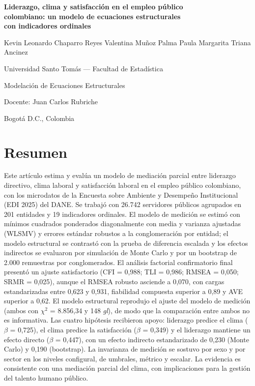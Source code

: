 \documentclass[11pt,a4paper]{article}
\newcommand{\chisq}{$\chi^2$}
\newcommand{\df}{\textit{gl}}
\begin{document}
\begin{center}
{\LARGE\bfseries Liderazgo, clima y satisfacción en el empleo público\\[2pt]
colombiano: un modelo de ecuaciones estructurales\\[2pt]
con indicadores ordinales\par}
\vspace{10pt}

{\large Kevin Leonardo Chaparro Reyes \quad Valentina Muñoz Palma \quad Paula Margarita Triana Ancinez\par}
\vspace{4pt}
{\normalsize Universidad Santo Tomás --- Facultad de Estadística\par}
{\normalsize Modelación de Ecuaciones Estructurales\par}
{\normalsize Docente: Juan Carlos Rubriche\par}
{\normalsize Bogotá D.C., Colombia\par}
\end{center}

\vspace{6pt}

\section*{Resumen}

Este artículo estima y evalúa un modelo de mediación parcial entre liderazgo directivo,
clima laboral y satisfacción laboral en el empleo público colombiano, con los microdatos
de la Encuesta sobre Ambiente y Desempeño Institucional (EDI 2025) del DANE. Se trabajó con
26.742 servidores públicos agrupados en 201 entidades y 19 indicadores ordinales. El modelo
de medición se estimó con mínimos cuadrados ponderados diagonalmente con media y varianza
ajustadas (WLSMV) y errores estándar robustos a la conglomeración por entidad; el modelo
estructural se contrastó con la prueba de diferencia escalada y los efectos indirectos se
evaluaron por simulación de Monte Carlo y por un bootstrap de 2.000 remuestras por
conglomerados. El análisis factorial confirmatorio final presentó un ajuste satisfactorio
(CFI = 0,988; TLI = 0,986; RMSEA = 0,050; SRMR = 0,025), aunque el RMSEA robusto asciende a
0,070, con cargas estandarizadas entre 0,623 y 0,931, fiabilidad compuesta superior a 0,89 y
AVE superior a 0,62. El modelo estructural reprodujo el ajuste del modelo de medición (ambos
con \chisq{} = 8.856,34 y 148 \df), de modo que la comparación entre ambos no es
informativa. Las cuatro hipótesis recibieron apoyo: liderazgo predice el clima
($\beta$ = 0,725), el clima predice la satisfacción ($\beta$ = 0,349) y el liderazgo
mantiene un efecto directo ($\beta$ = 0,447), con un efecto indirecto estandarizado de 0,230
(Monte Carlo) y 0,190 (bootstrap). La invarianza de medición se sostuvo por sexo y por sector
en los niveles configural, de umbrales, métrico y escalar. La evidencia es consistente con una
mediación parcial del clima, con implicaciones para la gestión del talento humano público.
\end{document}
